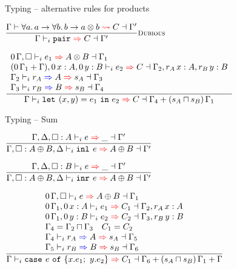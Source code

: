 \documentclass{beamer}
\begin{document}
\begin{frame}{Typing -- alternative rules for products}

\begin{center}
  $\infrule[Dubious]{\matching{\Gamma}{\ForallI{a}{\Fun{a}{\ForallI{b}{\Fun{b}{\Prod{a}{b}}}}}}{C}{\Gamma'}}{\infer{\Gamma}{\funpair}{C}{\Gamma'}}$

  \vspace{2em}

  $\infrule{\begin{array}{l} \infer{\scalectx{\Zero}{\Gamma}, \emptyhint}{e_1}{\Prod{A}{B}}{\Gamma_1} \\ \infer{(\addctx{\scalectx{\Zero}{\Gamma_1}}{\Gamma}), \var[\Zero]{x}{A}, \var[\Zero]{y}{B}}{e_2}{C}{\Gamma_2, \var[r_A]{x}{A}, \var[r_B]{y}{B}} \\ \newkinding{\Gamma_2}{r_A}{A}{s_A}{\Gamma_3} \\ \newkinding{\Gamma_3}{r_B}{B}{s_B}{\Gamma_4} \end{array}}{\infer{\Gamma}{\letpair{x}{y}{e_1}{e_2}}{C}{\addctx{\Gamma_4}{\scalectx{(\glbqty{s_A}{s_B})}{\Gamma_1}}}}$
\end{center}

\end{frame}

\begin{frame}{Typing -- Sum}

\begin{center}
  $\infrule{\infer{\Gamma, \Delta, \typehint{A}}{e}{\_}{\Gamma'}}{\infer{\Gamma, \typehint{\Sum{A}{B}}, \Delta}{\inl{e}}{\Sum{A}{B}}{\Gamma'}}$

  \vspace{2em}

  $\infrule{\infer{\Gamma, \Delta, \typehint{B}}{e}{\_}{\Gamma'}}{\infer{\Gamma, \typehint{\Sum{A}{B}}, \Delta}{\inr{e}}{\Sum{A}{B}}{\Gamma'}}$

  \vspace{2em}

  $\infrule{\begin{array}{l} \infer{\scalectx{\Zero}{\Gamma}, \emptyhint}{e}{\Sum{A}{B}}{\Gamma_1} \\ \infer{\scalectx{\Zero}{\Gamma_1}, \var[\Zero]{x}{A}}{e_1}{C_1}{\Gamma_2, \var[r_A]{x}{A}} \\ \infer{\scalectx{\Zero}{\Gamma_1}, \var[\Zero]{y}{B}}{e_2}{C_2}{\Gamma_3, \var[r_B]{y}{B}} \\ \Gamma_4 = \glbctx{\Gamma_2}{\Gamma_3} \quad C_1 = C_2 \\ \newkinding{\Gamma_4}{r_A}{A}{s_A}{\Gamma_5} \\ \newkinding{\Gamma_5}{r_B}{B}{s_B}{\Gamma_6} \end{array}}{\infer{\Gamma}{\newcase{e}{x}{e_1}{y}{e_2}}{C_1}{\addctx{\Gamma_6}{\addctx{\scalectx{(\glbqty{s_A}{s_B})}{\Gamma_1}}{\Gamma}}}}$
\end{center}

\end{frame}
\end{document}

